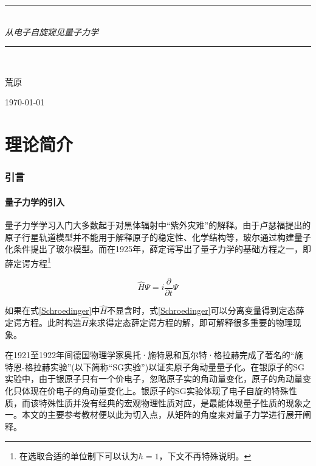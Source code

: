 \documentclass[UTF8,12pt]{article}
\numberwithin{equation}{subsection}
\newcommand{\HRule}{\rule{\linewidth}{0.5mm}}
\begin{document}
	\begin{titlepage}
		\begin{center}    
			\HRule \\[0.4cm]
			{ \huge \emph {从电子自旋窥见量子力学}}\\[0.4cm]%
			\rule{\linewidth}{0.2mm} \\[1.5cm]
			
			\begin{minipage}{0.4\textwidth}
				\begin{flushleft} \large
				\end{flushleft}
			\end{minipage}
			\begin{minipage}{0.4\textwidth}
				\begin{flushright} \large
					\Large 荒原%
				\end{flushright}
			\end{minipage}
			\vfill
			{\large \today}
		\end{center}
	\end{titlepage}
	\clearpage
	\tableofcontents
	\clearpage
	\part{理论简介}
	\section{引言}
	\subsection{量子力学的引入}
	量子力学学习入门大多数起于对黑体辐射中“紫外灾难”的解释。由于卢瑟福提出的原子行星轨道模型并不能用于解释原子的稳定性、化学结构等，玻尔通过构建量子化条件提出了玻尔模型。而在1925年，薛定谔写出了量子力学的基础方程之一，即薛定谔方程\footnote{在选取合适的单位制下可以认为$\hbar=1$，下文不再特殊说明。}
	\begin{snugshade}
		\begin{equation}
			\hat H\Psi=i\frac{\partial}{\partial t}\Psi
			\label{Schroedinger}
		\end{equation}
	\end{snugshade}
		
	如果在式\ref{Schroedinger}中$\hat H$不显含时，式\ref{Schroedinger}可以分离变量得到定态薛定谔方程。此时构造$\hat H$来求得定态薛定谔方程的解，即可解释很多重要的物理现象。
	
	在1921至1922年间德国物理学家奥托·施特恩和瓦尔特·格拉赫完成了著名的“施特恩-格拉赫实验”(以下简称“SG实验”)以证实原子角动量量子化。在银原子的SG实验中，由于银原子只有一个价电子，忽略原子实的角动量变化，原子的角动量变化只体现在价电子的角动量变化上。银原子的SG实验体现了电子自旋的特殊性质，而该特殊性质并没有经典的宏观物理性质对应，是最能体现量子性质的现象之一。本文的主要参考教材\parencite{sakurai1995modern}便以此为切入点，从矩阵的角度来对量子力学进行展开阐释。
	\newpage
\end{document}
